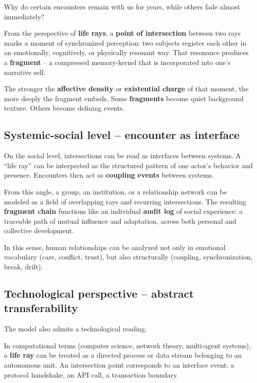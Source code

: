 Why do certain encounters remain with us for years, while others fade almost immediately?

From the perspective of \textbf{life rays},
a \textbf{point of intersection} between two rays marks a moment of synchronized perception:
two subjects register each other in an emotionally, cognitively, or physically resonant way.
That resonance produces a \textbf{fragment} -- a compressed memory-kernel
that is incorporated into one's narrative self.

The stronger the \textbf{affective density} or \textbf{existential charge} of that moment,
the more deeply the fragment embeds. Some \textbf{fragments} become quiet background texture.
Others become defining events.


\subsection{Systemic-social level -- encounter as interface}

On the social level, intersections can be read as interfaces between systems.
A ``life ray'' can be interpreted as the structured pattern of one actor's behavior and presence.
Encounters then act as \textbf{coupling events}  between systems.

From this angle, a group, an institution, or a relationship network can be modeled as a field of overlapping rays and recurring intersections.
The resulting \textbf{fragment chain} functions like an individual \textbf{audit log} of social experience:
a traceable path of mutual influence and adaptation, across both personal and collective development.

In this sense, human relationships can be analyzed not only in emotional vocabulary (care, conflict, trust),
but also structurally (coupling, synchronization, break, drift).

\subsection{Technological perspective -- abstract transferability}

The model also admits a technological reading.

In computational terms (computer science, network theory, multi-agent systems),
a \textbf{life ray }can be treated as a directed process or data stream belonging to an autonomous unit.
An intersection point corresponds to an interface event: a protocol handshake, an API call, a transaction boundary.

